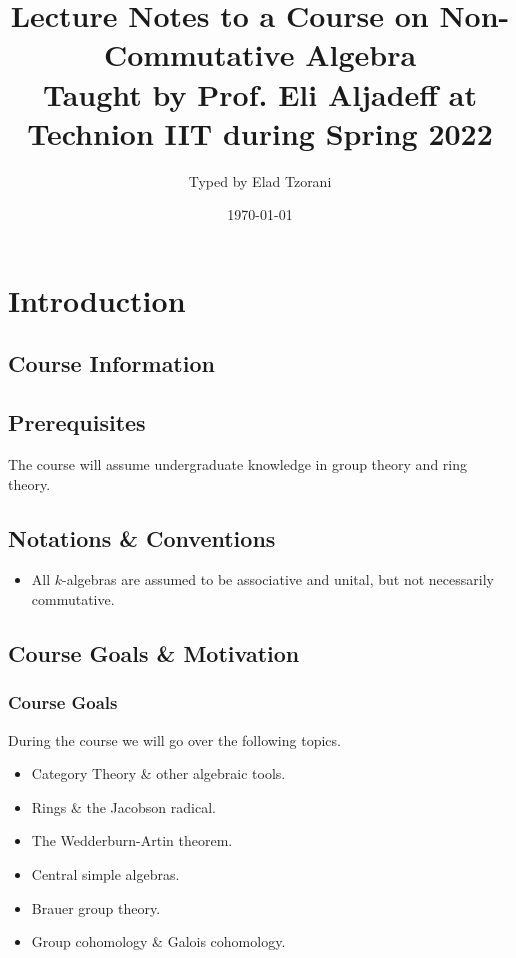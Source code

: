 \documentclass[11pt]{kbook}
\title{Lecture Notes to a Course on Non-Commutative Algebra \\ \small{Taught by Prof. Eli Aljadeff at Technion IIT during Spring 2022}}
\author{Typed by Elad Tzorani}
\date{\today}
\begin{document}
\maketitle


\chapter{Introduction}

\section*{Course Information}


\section*{Prerequisites}

The course will assume undergraduate knowledge in group theory and ring theory.

\section*{Notations \& Conventions}


\begin{itemize}
\item All $k$-algebras are assumed to be associative and unital, but not necessarily commutative.
\end{itemize}

\section*{Course Goals \& Motivation}

\subsection*{Course Goals}

During the course we will go over the following topics.

\begin{itemize}
\item Category Theory \& other algebraic tools.

\item Rings \& the Jacobson radical.

\item The Wedderburn-Artin theorem.

\item Central simple algebras.

\item Brauer group theory.

\item Group cohomology \& Galois cohomology.

\end{itemize}
\end{document}
